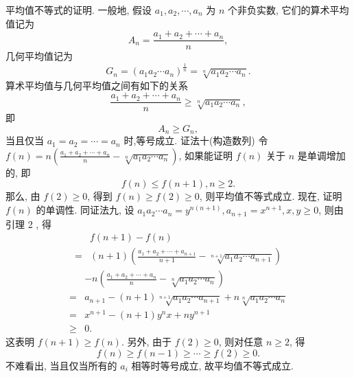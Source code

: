平均值不等式的证明.
一般地, 假设 $a_1, a_2, \cdots, a_n$ 为 $n$ 个非负实数, 它们的算术平均值记为
$$
A_n=\frac{a_1+a_2+\cdots+a_n}{n},
$$
几何平均值记为
$$
G_n=\left(a_1 a_2 \cdots a_n\right)^{\frac{1}{n}}=\sqrt[n]{a_1 a_2 \cdots a_n} .
$$
算术平均值与几何平均值之间有如下的关系
$$
\frac{a_1+a_2+\cdots+a_n}{n} \geqslant \sqrt[n]{a_1 a_2 \cdots a_n},
$$
即
$$
A_n \geqslant G_n,
$$
当且仅当 $a_1=a_2=\cdots=a_n$ 时,等号成立.
证法十(构造数列)
令 $f(n)=n\left(\frac{a_1+a_2+\cdots+a_n}{n}-\sqrt[n]{a_1 a_2 \cdots a_n}\right)$, 如果能证明 $f(n)$ 关于 $n$ 是单调增加的, 即
$$
f(n) \leqslant f(n+1), n \geqslant 2 .
$$
那么, 由 $f(2) \geqslant 0$, 得到 $f(n) \geqslant f(2) \geqslant 0$, 则平均值不等式成立.
现在, 证明 $f(n)$ 的单调性.
同证法九, 设 $a_1 a_2 \cdots a_n=y^{n(n+1)}, a_{n+1}=x^{n+1}, x, y \geqslant 0$, 则由引理 2 , 得
$$
\begin{aligned}
& f(n+1)-f(n) \\
= & (n+1)\left(\frac{a_1+a_2+\cdots+a_{n+1}}{n+1}-\sqrt[n+1]{a_1 a_2 \cdots a_{n+1}}\right)
\end{aligned}
$$
$$
\begin{aligned}
& -n\left(\frac{a_1+a_2+\cdots+a_n}{n}-\sqrt[n]{a_1 a_2 \cdots a_n}\right) \\
= & a_{n+1}-(n+1) \sqrt[n+1]{a_1 a_2 \cdots a_{n+1}}+n \sqrt[n]{a_1 a_2 \cdots a_n} \\
= & x^{n+1}-(n+1) y^n x+n y^{n+1} \\
\geqslant & 0 .
\end{aligned}
$$
这表明 $f(n+1) \geqslant f(n)$.
另外, 由于 $f(2) \geqslant 0$, 则对任意 $n \geqslant 2$, 得
$$
f(n) \geqslant f(n-1) \geqslant \cdots \geqslant f(2) \geqslant 0 .
$$
不难看出, 当且仅当所有的 $a_i$ 相等时等号成立, 故平均值不等式成立.



